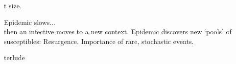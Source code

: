 t size.

  
   Epidemic slows...  \\
    {then an infective moves to a new context.}
  Epidemic discovers new `pools' of susceptibles: \alert{Resurgence}.
   \alert{Importance of rare, stochastic events.}
  

terlude


%


